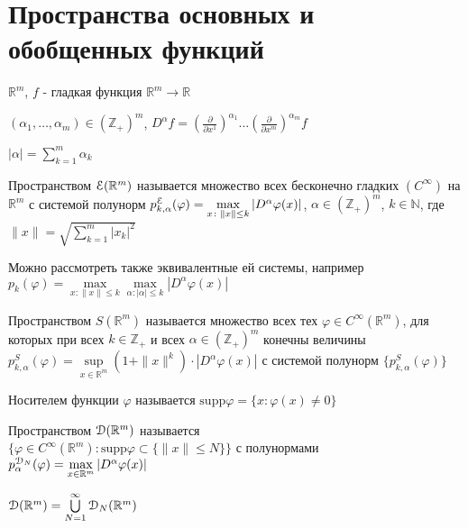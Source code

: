 \documentclass[a4paper,12pt]{report}
\begin{document}
\chapter{Пространства основных и обобщенных функций}

$\mathbb R^m$, $f$ - гладкая функция $\mathbb R^m\to\mathbb R$

$(\alpha_1,\ldots,\alpha_m)\in(\mathbb Z_+)^m$, $D^\alpha f=\left(\displaystyle\frac{\partial}{\partial x^1}\right)^{\alpha_1}\ldots\left(\displaystyle\frac{\partial}{\partial x^m}\right)^{\alpha_m}f$

$|\alpha|=\sum\limits_{k=1}^m\alpha_k$



\begin{df}
Пространством $\EuScript E(\mathbb R^m)$ называется множество всех бесконечно гладких $(C^\infty)$ на $\mathbb R^m$ с системой полунорм $p_{k,\alpha}^{\EuScript E}(\varphi)=\max\limits_{x\colon\|x\|\le k}|D^\alpha\varphi(x)|$, $\alpha\in(\mathbb Z_+)^m$, $k\in\mathbb N$, где $\|x\|=\sqrt{\sum\limits_{k=1}^m|x_k|^2}$

Можно рассмотреть также эквивалентные ей системы, например\\ $p_k(\varphi)=\max\limits_{x\colon\|x\|\le k}\max\limits_{\alpha\colon|\alpha|\le k}|D^\alpha\varphi(x)|$
\end{df}


\begin{df}
Пространством $S(\mathbb R^m)$ называется множество всех тех $\varphi\in C^\infty(\mathbb R^m)$, для которых при всех $k\in\mathbb Z_+$ и всех $\alpha\in(\mathbb Z_+)^m$ конечны величины $p_{k,\alpha}^S(\varphi)=\sup\limits_{x\in\mathbb R^m}(1+\|x\|^k)\cdot|D^\alpha\varphi(x)|$ с системой полунорм $\{p_{k,\alpha}^S(\varphi)\}$
\end{df}


\begin{df}
Носителем функции $\varphi$ называется $\mathrm{supp}\varphi=\{x\colon\varphi(x)\ne0\}$
\end{df}


\begin{df}
Пространством $\EuScript D(\mathbb R^m)$ называется \\$\bigl\{\varphi\in C^\infty(\mathbb R^m)\colon \mathrm{supp}\varphi\subset\{\|x\|\le N\}\bigl\}$ с полунормами $p_\alpha^{\EuScript D_N}(\varphi)=\max\limits_{x\in\mathbb R^m}|D^\alpha\varphi(x)|$
\end{df}


\begin{df}
$\EuScript D(\mathbb R^m)=\bigcup\limits_{N=1}^\infty\EuScript D_N(\mathbb R^m)$
\end{df}
\end{document}
